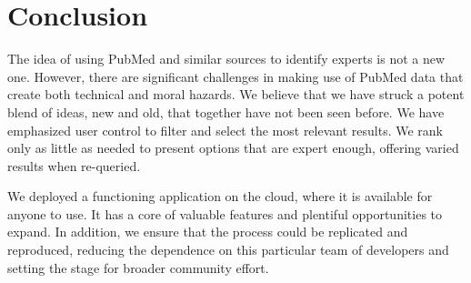\section{Conclusion}

The idea of using PubMed and similar sources to identify experts is not a new one. However, there are significant challenges in making use of PubMed data that create both technical and moral hazards. We believe that we have struck a potent blend of ideas, new and old, that together have not been seen before. We have emphasized user control to filter and select the most relevant results. We rank only as little as needed to present options that are expert enough, offering varied results when re-queried.

We deployed a functioning application on the cloud, where it is available for anyone to use. It has a core of valuable features and plentiful opportunities to expand. In addition, we ensure that the process could be replicated and reproduced, reducing the dependence on this particular team of developers and setting the stage for broader community effort.